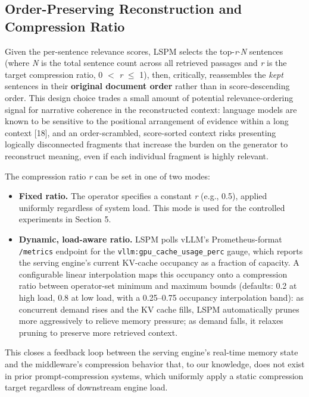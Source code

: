 \documentclass[pdflatex,sn-basic,Numbered]{sn-jnl}
\begin{document}
\subsection{Order-Preserving Reconstruction and Compression Ratio}
Given the per-sentence relevance scores, LSPM selects the top-\textit{r}$\cdot$\textit{N} sentences (where \textit{N} is the total sentence count across all retrieved passages and \textit{r} is the target compression ratio, 0 $<$ \textit{r} $\leq$ 1), then, critically, reassembles the \textit{kept} sentences in their \textbf{original document order} rather than in score-descending order. This design choice trades a small amount of potential relevance-ordering signal for narrative coherence in the reconstructed context: language models are known to be sensitive to the positional arrangement of evidence within a long context [18], and an order-scrambled, score-sorted context risks presenting logically disconnected fragments that increase the burden on the generator to reconstruct meaning, even if each individual fragment is highly relevant.

The compression ratio \textit{r} can be set in one of two modes:

\begin{itemize}
\item \textbf{Fixed ratio.} The operator specifies a constant \textit{r} (e.g., 0.5), applied uniformly regardless of system load. This mode is used for the controlled experiments in Section 5.
\item \textbf{Dynamic, load-aware ratio.} LSPM polls vLLM's Prometheus-format \texttt{/metrics} endpoint for the \texttt{vllm:gpu\_cache\_usage\_perc} gauge, which reports the serving engine's current KV-cache occupancy as a fraction of capacity. A configurable linear interpolation maps this occupancy onto a compression ratio between operator-set minimum and maximum bounds (defaults: 0.2 at high load, 0.8 at low load, with a 0.25--0.75 occupancy interpolation band): as concurrent demand rises and the KV cache fills, LSPM automatically prunes more aggressively to relieve memory pressure; as demand falls, it relaxes pruning to preserve more retrieved context.
\end{itemize}
This closes a feedback loop between the serving engine's real-time memory state and the middleware's compression behavior that, to our knowledge, does not exist in prior prompt-compression systems, which uniformly apply a static compression target regardless of downstream engine load.
\end{document}
